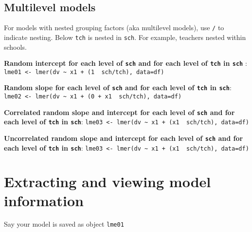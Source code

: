 \documentclass[
]{article}
\begin{document}
\subsection{Multilevel models}\label{multilevel-models}

For models with nested grouping factors (aka multilevel models), use
\texttt{/} to indicate nesting. Below \texttt{tch} is nested in
\texttt{sch}. For example, teachers nested within schools.

\textbf{Random intercept for each level of \texttt{sch} and for each
level of \texttt{tch} in \texttt{sch} }:
\texttt{lme01\ \textless{}-\ lmer(dv\ \textasciitilde{}\ x1\ +\ (1\ \textbar{}\ sch/tch),\ data=df)}

\textbf{Random slope for each level of \texttt{sch} and for each level
of \texttt{tch} in \texttt{sch}}:
\texttt{lme02\ \textless{}-\ lmer(dv\ \textasciitilde{}\ x1\ +\ (0\ +\ x1\ \textbar{}\ sch/tch),\ data=df)}

\textbf{Correlated random slope and intercept for each level of
\texttt{sch} and for each level of \texttt{tch} in \texttt{sch}}:
\texttt{lme03\ \textless{}-\ lmer(dv\ \textasciitilde{}\ x1\ +\ (x1\ \textbar{}\ sch/tch),\ data=df)}

\textbf{Uncorrelated random slope and intercept for each level of
\texttt{sch} and for each level of \texttt{tch} in \texttt{sch}}:
\texttt{lme03\ \textless{}-\ lmer(dv\ \textasciitilde{}\ x1\ +\ (x1\ \textbar{}\textbar{}\ sch/tch),\ data=df)}

\section{Extracting and viewing model
information}\label{extracting-and-viewing-model-information}

Say your model is saved as object \texttt{lme01}
\end{document}
